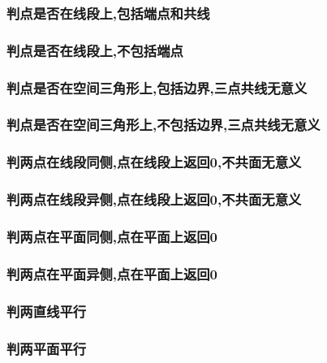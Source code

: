 \subsubsection{判点是否在线段上,包括端点和共线}

\subsubsection{判点是否在线段上,不包括端点}

\subsubsection{判点是否在空间三角形上,包括边界,三点共线无意义}

\subsubsection{判点是否在空间三角形上,不包括边界,三点共线无意义}

\subsubsection{判两点在线段同侧,点在线段上返回0,不共面无意义}

\subsubsection{判两点在线段异侧,点在线段上返回0,不共面无意义}

\subsubsection{判两点在平面同侧,点在平面上返回0}

\subsubsection{判两点在平面异侧,点在平面上返回0}

\subsubsection{判两直线平行}

\subsubsection{判两平面平行}

